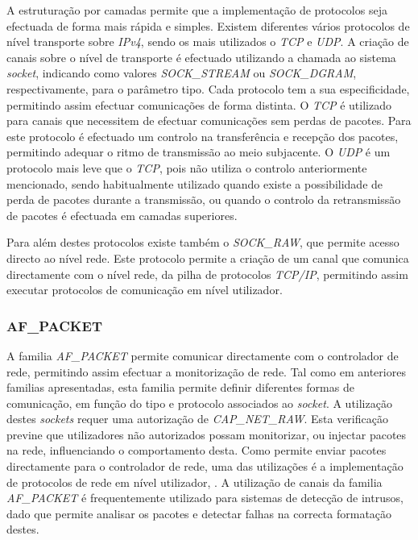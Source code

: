 A estruturação por camadas permite que a implementação de protocolos seja efectuada de forma mais rápida e simples.
Existem diferentes vários protocolos de nível transporte sobre \textit{IPv4}, sendo os mais utilizados o \textit{TCP} e \textit{UDP}.
A criação de canais sobre o nível de transporte é efectuado utilizando a chamada ao sistema \textit{socket}, indicando como valores \textit{SOCK\_STREAM} ou \textit{SOCK\_DGRAM}, respectivamente, para o parâmetro tipo.
Cada protocolo tem a sua especificidade, permitindo assim efectuar comunicações de forma distinta.
O \textit{TCP} é utilizado para canais que necessitem de efectuar comunicações sem perdas de pacotes.
Para este protocolo é efectuado um controlo na transferência e recepção dos pacotes, permitindo adequar o ritmo de transmissão ao meio subjacente.
O \textit{UDP} é um protocolo mais leve que o \textit{TCP}, pois não utiliza o controlo anteriormente mencionado, sendo habitualmente utilizado quando existe a possibilidade de perda de pacotes durante a transmissão, ou quando o controlo da retransmissão de pacotes é efectuada em camadas superiores.

Para além destes protocolos existe também o \textit{SOCK\_RAW}, que permite acesso directo ao nível rede.
Este protocolo permite a criação de um canal que comunica directamente com o nível rede, da pilha de protocolos \textit{TCP/IP}, permitindo assim executar protocolos de comunicação em nível utilizador.

\subsubsection{AF\_PACKET}
\label{subsub:af_packet}

A familia \textit{AF\_PACKET} permite comunicar directamente com o controlador de rede, permitindo assim efectuar a monitorização de rede.
Tal como em anteriores familias apresentadas, esta familia permite definir diferentes formas de comunicação, em função do tipo e protocolo associados ao \textit{socket}.
A utilização destes \textit{sockets} requer uma autorização de \textit{CAP\_NET\_RAW}.
Esta verificação previne que utilizadores não autorizados possam monitorizar, ou injectar pacotes na rede, influenciando o comportamento desta.
Como permite enviar pacotes directamente para o controlador de rede, uma das utilizações é a implementação de protocolos de rede em nível utilizador, .
A utilização de canais da familia \textit{AF\_PACKET} é frequentemente utilizado para sistemas de detecção de intrusos, dado que permite analisar os pacotes e detectar falhas na correcta formatação destes.

